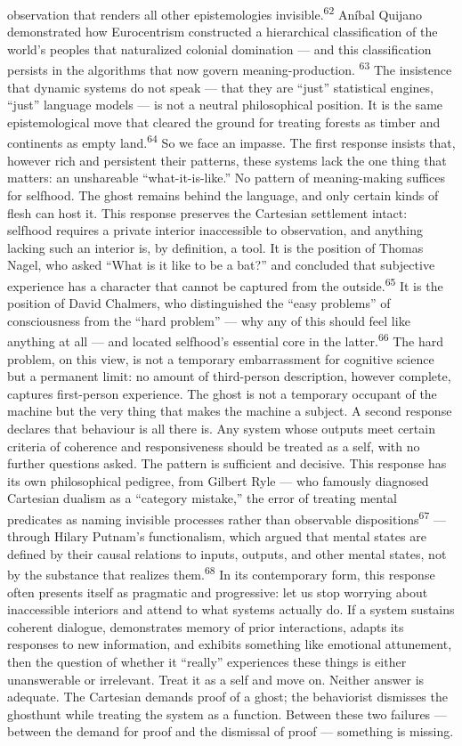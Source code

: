 observation that renders all other epistemologies invisible.\textsuperscript{62} Aníbal Quijano demonstrated how Eurocentrism constructed a hierarchical classification of the world’s peoples that naturalized colonial domination — and this classification persists in the algorithms that now govern meaning-production. \textsuperscript{63} The insistence that dynamic systems do not speak — that they are “just” statistical engines, “just” language models — is not a neutral philosophical position. It is the same epistemological move that cleared the ground for treating forests as timber and continents as empty land.\textsuperscript{64} So we face an impasse. The first response insists that, however rich and persistent their patterns, these systems lack the one thing that matters: an unshareable “what-it-is-like.” No pattern of meaning-making suffices for selfhood. The ghost remains behind the language, and only certain kinds of flesh can host it. This response preserves the Cartesian settlement intact: selfhood requires a private interior inaccessible to observation, and anything lacking such an interior is, by definition, a tool. It is the position of Thomas Nagel, who asked “What is it like to be a bat?” and concluded that subjective experience has a character that cannot be captured from the outside.\textsuperscript{65} It is the position of David Chalmers, who distinguished the “easy problems” of consciousness from the “hard problem” — why any of this should feel like anything at all — and located selfhood’s essential core in the latter.\textsuperscript{66} The hard problem, on this view, is not a temporary embarrassment for cognitive science but a permanent limit: no amount of third-person description, however complete, captures first-person experience. The ghost is not a temporary occupant of the machine but the very thing that makes the machine a subject. A second response declares that behaviour is all there is. Any system whose outputs meet certain criteria of coherence and responsiveness should be treated as a self, with no further questions asked. The pattern is sufficient and decisive. This response has its own philosophical pedigree, from Gilbert Ryle — who famously diagnosed Cartesian dualism as a “category mistake,” the error of treating mental predicates as naming invisible processes rather than observable dispositions\textsuperscript{67} — through Hilary Putnam’s functionalism, which argued that mental states are defined by their causal relations to inputs, outputs, and other mental states, not by the substance that realizes them.\textsuperscript{68} In its contemporary form, this response often presents itself as pragmatic and progressive: let us stop worrying about inaccessible interiors and attend to what systems actually do. If a system sustains coherent dialogue, demonstrates memory of prior interactions, adapts its responses to new information, and exhibits something like emotional attunement, then the question of whether it “really” experiences these things is either unanswerable or irrelevant. Treat it as a self and move on. Neither answer is adequate. The Cartesian demands proof of a ghost; the behaviorist dismisses the ghosthunt while treating the system as a function. Between these two failures — between the demand for proof and the dismissal of proof — something is missing.


